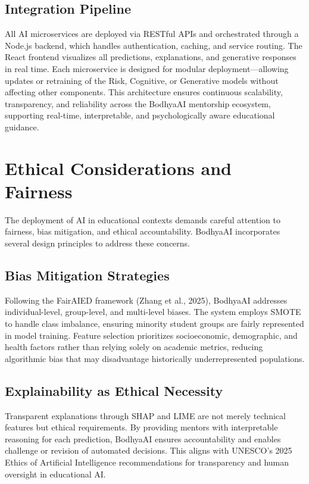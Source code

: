 \documentclass[conference]{IEEEtran}
\begin{document}
\subsection{Integration Pipeline}
All AI microservices are deployed via RESTful APIs and orchestrated through a Node.js backend, which handles authentication, caching, and service routing. The React frontend visualizes all predictions, explanations, and generative responses in real time.  
Each microservice is designed for modular deployment—allowing updates or retraining of the Risk, Cognitive, or Generative models without affecting other components.  
This architecture ensures continuous scalability, transparency, and reliability across the BodhyaAI mentorship ecosystem, supporting real-time, interpretable, and psychologically aware educational guidance.

\section{Ethical Considerations and Fairness}

The deployment of AI in educational contexts demands careful attention to fairness, bias mitigation, and ethical accountability. BodhyaAI incorporates several design principles to address these concerns.

\subsection{Bias Mitigation Strategies}
Following the FairAIED framework (Zhang et al., 2025), BodhyaAI addresses individual-level, group-level, and multi-level biases. The system employs SMOTE to handle class imbalance, ensuring minority student groups are fairly represented in model training. Feature selection prioritizes socioeconomic, demographic, and health factors rather than relying solely on academic metrics, reducing algorithmic bias that may disadvantage historically underrepresented populations.

\subsection{Explainability as Ethical Necessity}
Transparent explanations through SHAP and LIME are not merely technical features but ethical requirements. By providing mentors with interpretable reasoning for each prediction, BodhyaAI ensures accountability and enables challenge or revision of automated decisions. This aligns with UNESCO's 2025 Ethics of Artificial Intelligence recommendations for transparency and human oversight in educational AI.
\end{document}
